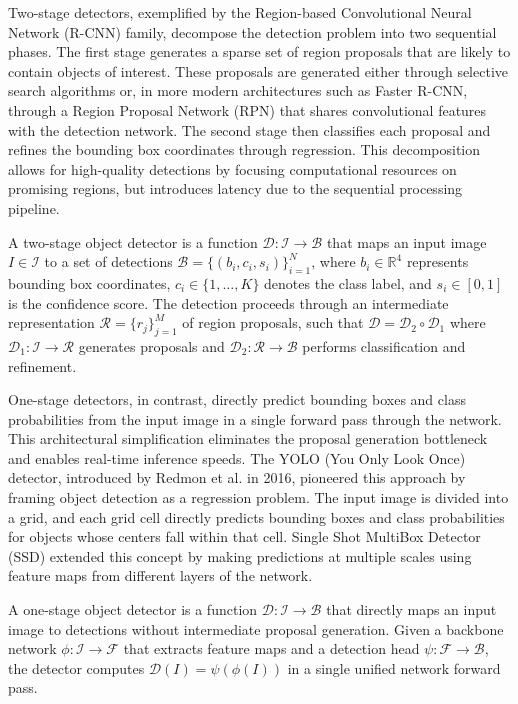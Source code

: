 Two-stage detectors, exemplified by the Region-based Convolutional Neural Network (R-CNN) family, decompose the detection problem into two sequential phases. The first stage generates a sparse set of region proposals that are likely to contain objects of interest. These proposals are generated either through selective search algorithms or, in more modern architectures such as Faster R-CNN, through a Region Proposal Network (RPN) that shares convolutional features with the detection network. The second stage then classifies each proposal and refines the bounding box coordinates through regression. This decomposition allows for high-quality detections by focusing computational resources on promising regions, but introduces latency due to the sequential processing pipeline.

\begin{definition}
\label{def:two_stage}
A two-stage object detector is a function $\mathcal{D}: \mathcal{I} \rightarrow \mathcal{B}$ that maps an input image $I \in \mathcal{I}$ to a set of detections $\mathcal{B} = \{(b_i, c_i, s_i)\}_{i=1}^{N}$, where $b_i \in \mathbb{R}^4$ represents bounding box coordinates, $c_i \in \{1, \ldots, K\}$ denotes the class label, and $s_i \in [0,1]$ is the confidence score. The detection proceeds through an intermediate representation $\mathcal{R} = \{r_j\}_{j=1}^{M}$ of region proposals, such that $\mathcal{D} = \mathcal{D}_2 \circ \mathcal{D}_1$ where $\mathcal{D}_1: \mathcal{I} \rightarrow \mathcal{R}$ generates proposals and $\mathcal{D}_2: \mathcal{R} \rightarrow \mathcal{B}$ performs classification and refinement.
\end{definition}

One-stage detectors, in contrast, directly predict bounding boxes and class probabilities from the input image in a single forward pass through the network. This architectural simplification eliminates the proposal generation bottleneck and enables real-time inference speeds. The YOLO (You Only Look Once) detector, introduced by Redmon et al. in 2016, pioneered this approach by framing object detection as a regression problem. The input image is divided into a grid, and each grid cell directly predicts bounding boxes and class probabilities for objects whose centers fall within that cell. Single Shot MultiBox Detector (SSD) extended this concept by making predictions at multiple scales using feature maps from different layers of the network.

\begin{definition}
\label{def:one_stage}
A one-stage object detector is a function $\mathcal{D}: \mathcal{I} \rightarrow \mathcal{B}$ that directly maps an input image to detections without intermediate proposal generation. Given a backbone network $\phi: \mathcal{I} \rightarrow \mathcal{F}$ that extracts feature maps and a detection head $\psi: \mathcal{F} \rightarrow \mathcal{B}$, the detector computes $\mathcal{D}(I) = \psi(\phi(I))$ in a single unified network forward pass.
\end{definition}

